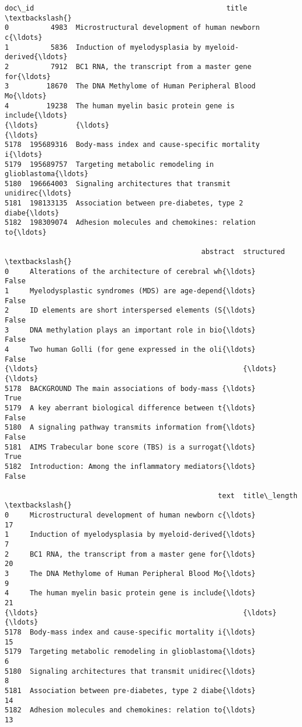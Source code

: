 \documentclass[11pt]{article}
\makeatletter
\newcommand{\boxspacing}{\kern\kvtcb@left@rule\kern\kvtcb@boxsep}
\newcommand{\prompt}[4]{
        {\ttfamily\llap{{\color{#2}[#3]:\hspace{3pt}#4}}\vspace{-\baselineskip}}
    }
\makeatother
\begin{document}
            \begin{tcolorbox}[breakable, size=fbox, boxrule=.5pt, pad at break*=1mm, opacityfill=0]
\prompt{Out}{outcolor}{15}{\boxspacing}
\begin{Verbatim}[commandchars=\\\{\}]
         doc\_id                                              title  \textbackslash{}
0          4983  Microstructural development of human newborn c{\ldots}
1          5836  Induction of myelodysplasia by myeloid-derived{\ldots}
2          7912  BC1 RNA, the transcript from a master gene for{\ldots}
3         18670  The DNA Methylome of Human Peripheral Blood Mo{\ldots}
4         19238  The human myelin basic protein gene is include{\ldots}
{\ldots}         {\ldots}                                                {\ldots}
5178  195689316  Body-mass index and cause-specific mortality i{\ldots}
5179  195689757  Targeting metabolic remodeling in glioblastoma{\ldots}
5180  196664003  Signaling architectures that transmit unidirec{\ldots}
5181  198133135  Association between pre-diabetes, type 2 diabe{\ldots}
5182  198309074  Adhesion molecules and chemokines: relation to{\ldots}

                                               abstract  structured  \textbackslash{}
0     Alterations of the architecture of cerebral wh{\ldots}       False
1     Myelodysplastic syndromes (MDS) are age-depend{\ldots}       False
2     ID elements are short interspersed elements (S{\ldots}       False
3     DNA methylation plays an important role in bio{\ldots}       False
4     Two human Golli (for gene expressed in the oli{\ldots}       False
{\ldots}                                                 {\ldots}         {\ldots}
5178  BACKGROUND The main associations of body-mass {\ldots}        True
5179  A key aberrant biological difference between t{\ldots}       False
5180  A signaling pathway transmits information from{\ldots}       False
5181  AIMS Trabecular bone score (TBS) is a surrogat{\ldots}        True
5182  Introduction: Among the inflammatory mediators{\ldots}       False

                                                   text  title\_length  \textbackslash{}
0     Microstructural development of human newborn c{\ldots}            17
1     Induction of myelodysplasia by myeloid-derived{\ldots}             7
2     BC1 RNA, the transcript from a master gene for{\ldots}            20
3     The DNA Methylome of Human Peripheral Blood Mo{\ldots}             9
4     The human myelin basic protein gene is include{\ldots}            21
{\ldots}                                                 {\ldots}           {\ldots}
5178  Body-mass index and cause-specific mortality i{\ldots}            15
5179  Targeting metabolic remodeling in glioblastoma{\ldots}             6
5180  Signaling architectures that transmit unidirec{\ldots}             8
5181  Association between pre-diabetes, type 2 diabe{\ldots}            14
5182  Adhesion molecules and chemokines: relation to{\ldots}            13


\end{Verbatim}
\end{tcolorbox}
\end{document}
